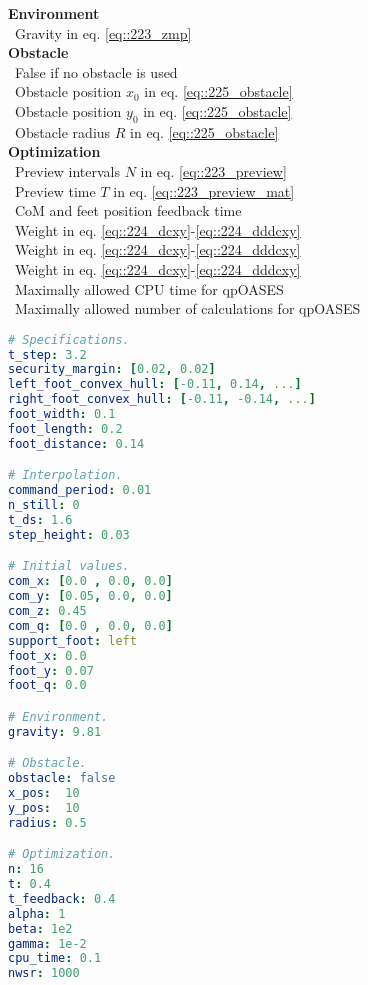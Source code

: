 \begin{minipage}[t]{1.\textwidth}
\begin{minipage}{0.5\textwidth}
{			\hfill \textbf{Environment}\\
			\mbox{}~\hfill Gravity in eq. \ref{eq::223_zmp}\\
			
			\hfill \textbf{Obstacle}\\
			\mbox{}~\hfill False if no obstacle is used\\
			\mbox{}~\hfill Obstacle position $x_0$ in eq. \ref{eq::225_obstacle}\\
			\mbox{}~\hfill Obstacle position $y_0$ in eq. \ref{eq::225_obstacle}\\
			\mbox{}~\hfill Obstacle radius $R$ in eq. \ref{eq::225_obstacle}\\
			
			\hfill \textbf{Optimization}\\
			\mbox{}~\hfill Preview intervals $N$ in eq. \ref{eq::223_preview}\\
			\mbox{}~\hfill Preview time $T$ in eq. \ref{eq::223_preview_mat}\\
			\mbox{}~\hfill CoM and feet position feedback time\\
			\mbox{}~\hfill Weight in eq. \ref{eq::224_dcxy}-\ref{eq::224_dddcxy}\\
			\mbox{}~\hfill Weight in eq. \ref{eq::224_dcxy}-\ref{eq::224_dddcxy}\\
			\mbox{}~\hfill Weight in eq. \ref{eq::224_dcxy}-\ref{eq::224_dddcxy}\\
			\mbox{}~\hfill Maximally allowed CPU time for qpOASES\\
			\mbox{}~\hfill Maximally allowed number of calculations for qpOASES}
	\end{minipage}
	\begin{minipage}{0.5\textwidth}
		\begin{lstlisting}[language=yaml]
# Specifications.
t_step: 3.2
security_margin: [0.02, 0.02]
left_foot_convex_hull: [-0.11, 0.14, ...]
right_foot_convex_hull: [-0.11, -0.14, ...]
foot_width: 0.1
foot_length: 0.2
foot_distance: 0.14

# Interpolation.
command_period: 0.01
n_still: 0
t_ds: 1.6
step_height: 0.03

# Initial values.
com_x: [0.0 , 0.0, 0.0]
com_y: [0.05, 0.0, 0.0]
com_z: 0.45
com_q: [0.0 , 0.0, 0.0]
support_foot: left
foot_x: 0.0
foot_y: 0.07
foot_q: 0.0

# Environment.
gravity: 9.81

# Obstacle.
obstacle: false
x_pos:  10
y_pos:  10
radius: 0.5

# Optimization.
n: 16
t: 0.4
t_feedback: 0.4
alpha: 1
beta: 1e2
gamma: 1e-2
cpu_time: 0.1
nwsr: 1000
		\end{lstlisting}
	\end{minipage}
	\label{sec::32_pg_conf}
\end{minipage}
